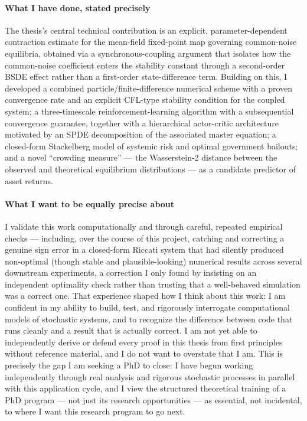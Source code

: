 \documentclass[11pt]{article}
\begin{document}
\paragraph{What I have done, stated precisely} The thesis's central technical contribution is an
explicit, parameter-dependent contraction estimate for the mean-field fixed-point map governing
common-noise equilibria, obtained via a synchronous-coupling argument that isolates how the
common-noise coefficient enters the stability constant through a second-order BSDE effect rather
than a first-order state-difference term. Building on this, I developed a combined
particle/finite-difference numerical scheme with a proven convergence rate and an explicit
CFL-type stability condition for the coupled system; a three-timescale reinforcement-learning
algorithm with a subsequential convergence guarantee, together with a hierarchical actor-critic
architecture motivated by an SPDE decomposition of the associated master equation; a closed-form
Stackelberg model of systemic risk and optimal government bailouts; and a novel ``crowding
measure'' --- the Wasserstein-2 distance between the observed and theoretical equilibrium
distributions --- as a candidate predictor of asset returns.

\paragraph{What I want to be equally precise about} I validate this work computationally and
through careful, repeated empirical checks --- including, over the course of this project, catching
and correcting a genuine sign error in a closed-form Riccati system that had silently produced
non-optimal (though stable and plausible-looking) numerical results across several downstream
experiments, a correction I only found by insisting on an independent optimality check rather than
trusting that a well-behaved simulation was a correct one. That experience shaped how I think about
this work: I am confident in my ability to build, test, and rigorously interrogate computational
models of stochastic systems, and to recognize the difference between code that runs cleanly and a
result that is actually correct. I am not yet able to independently derive or defend every proof in
this thesis from first principles without reference material, and I do not want to overstate that I
am. This is precisely the gap I am seeking a PhD to close: I have begun working independently
through real analysis and rigorous stochastic processes in parallel with this application cycle, and
I view the structured theoretical training of a PhD program --- not just its research opportunities
--- as essential, not incidental, to where I want this research program to go next.
\end{document}
